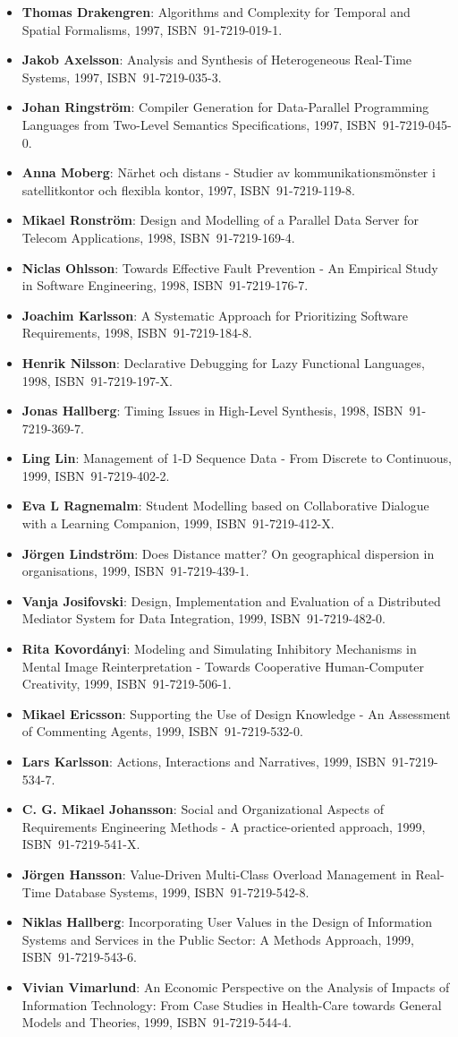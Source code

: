 \documentclass[a4paper,showtrims,twocolumn]{memoir}
\newenvironment{theses}{
  \begin{itemize}
    \setlength{\itemsep}{0.2em}
    \setlength{\parskip}{0em}
    \setlength{\parsep}{0em}
}{
  \end{itemize}
}
\newcommand{\thesis}[5]{\item[No.~#1] \textbf{#2}: #3, #4, ISBN~#5.}
\begin{document}
\begin{theses}
    \thesis{498}{Thomas Drakengren}{Algorithms and Complexity for Temporal and Spatial Formalisms}{1997}{91-7219-019-1}
    \thesis{502}{Jakob Axelsson}{Analysis and Synthesis of Heterogeneous Real-Time Systems}{1997}{91-7219-035-3}
    \thesis{503}{Johan Ringström}{Compiler Generation for Data-Parallel Programming Languages from Two-Level Semantics Specifications}{1997}{91-7219-045-0}
    \thesis{512}{Anna Moberg}{Närhet och distans - Studier av kommunikationsmönster i satellitkontor och flexibla kontor}{1997}{91-7219-119-8}
    \thesis{520}{Mikael Ronström}{Design and Modelling of a Parallel Data Server for Telecom Applications}{1998}{91-7219-169-4}
    \thesis{522}{Niclas Ohlsson}{Towards Effective Fault Prevention - An Empirical Study in Software Engineering}{1998}{91-7219-176-7}
    \thesis{526}{Joachim Karlsson}{A Systematic Approach for Prioritizing Software Requirements}{1998}{91-7219-184-8}
    \thesis{530}{Henrik Nilsson}{Declarative Debugging for Lazy Functional Languages}{1998}{91-7219-197-X}
    \thesis{555}{Jonas Hallberg}{Timing Issues in High-Level Synthesis}{1998}{91-7219-369-7}
    \thesis{561}{Ling Lin}{Management of 1-D Sequence Data - From Discrete to Continuous}{1999}{91-7219-402-2}
    \thesis{563}{Eva L Ragnemalm}{Student Modelling based on Collaborative Dialogue with a Learning Companion}{1999}{91-7219-412-X}
    \thesis{567}{Jörgen Lindström}{Does Distance matter? On geographical dispersion in organisations}{1999}{91-7219-439-1}
    \thesis{582}{Vanja Josifovski}{Design, Implementation and Evaluation of a Distributed Mediator System for Data Integration}{1999}{91-7219-482-0}
    \thesis{589}{Rita Kovordányi}{Modeling and Simulating Inhibitory Mechanisms in Mental Image Reinterpretation - Towards Cooperative Human-Computer Creativity}{1999}{91-7219-506-1}
    \thesis{592}{Mikael Ericsson}{Supporting the Use of Design Knowledge - An Assessment of Commenting Agents}{1999}{91-7219-532-0}
    \thesis{593}{Lars Karlsson}{Actions, Interactions and Narratives}{1999}{91-7219-534-7}
    \thesis{594}{C. G. Mikael Johansson}{Social and Organizational Aspects of Requirements Engineering Methods - A practice-oriented approach}{1999}{91-7219-541-X}
    \thesis{595}{Jörgen Hansson}{Value-Driven Multi-Class Overload Management in Real-Time Database Systems}{1999}{91-7219-542-8}
    \thesis{596}{Niklas Hallberg}{Incorporating User Values in the Design of Information Systems and Services in the Public Sector: A Methods Approach}{1999}{91-7219-543-6}
    \thesis{597}{Vivian Vimarlund}{An Economic Perspective on the Analysis of Impacts of Information Technology: From Case Studies in Health-Care towards General Models and Theories}{1999}{91-7219-544-4}

\end{theses}
\end{document}
